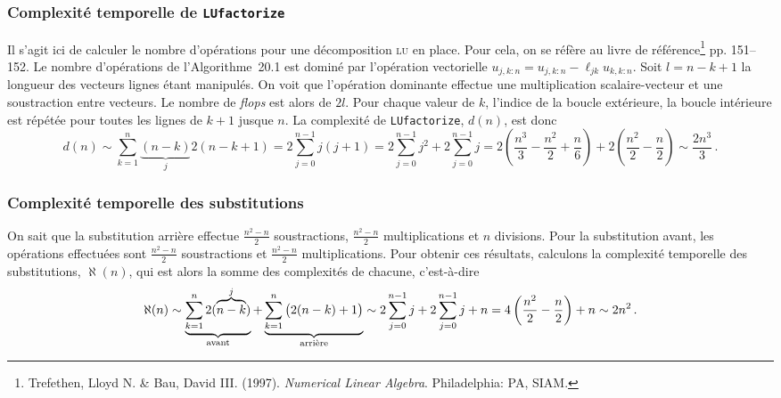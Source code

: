 \documentclass[11pt]{article}
\begin{document}
\subsubsection{Complexité temporelle de \texttt{LUfactorize}}
Il s'agit ici de calculer le nombre d'opérations pour une décomposition \textsc{lu} en place. Pour cela, on se réfère au livre de référence\footnote{Trefethen, Lloyd N. \& Bau, David \textrm{III}. (1997). \textit{Numerical Linear Algebra}. Philadelphia: PA, SIAM.} pp. 151--152.
Le nombre d'opérations de l'Algorithme~20.1 est dominé par l'opération vectorielle $u_{j, k:n} = u_{j, k:n} - \ell_{jk} u_{k, k:n}$.
Soit $l = n - k + 1$ la longueur des vecteurs lignes étant manipulés.
On voit que l'opération dominante effectue une multiplication scalaire-vecteur et une soustraction entre vecteurs. Le nombre de \emph{flops} est alors de $2l$.
Pour chaque valeur de $k$, l'indice de la boucle extérieure, la boucle intérieure est répétée pour toutes les lignes de $k+1$ jusque $n$.
La complexité de \lstinline|LUfactorize|, $d(n)$, est donc
\[
d(n) \sim \sum_{k=1}^{n} \underbrace{(n - k)}_{j} 2(n - k + 1) = 2 \sum_{j=0}^{n-1} j (j+1) = 2 \sum_{j=0}^{n-1} j^2  + 2 \sum_{j=0}^{n-1} j = 2 \left(\frac{n^3}{3} - \frac{n^2}{2} + \frac{n}{6}\right) + 2 \left(\frac{n^2}{2} - \frac{n}{2}\right) \sim \frac{2 n^3}{3}\,. 
\]
\subsubsection{Complexité temporelle des substitutions}
On sait que la substitution arrière effectue $\frac{n^2 - n}{2}$ soustractions, $\frac{n^2 - n}{2}$ multiplications et $n$ divisions.
Pour la substitution avant, les opérations effectuées sont $\frac{n^2 - n}{2}$ soustractions et $\frac{n^2 - n}{2}$ multiplications.
Pour obtenir ces résultats, calculons la complexité temporelle des substitutions, $\aleph(n)$, qui est alors la somme des complexités de chacune, c'est-à-dire
\[
\aleph(n) \sim \underbrace{\sum_{k=1}^{n} 2(\overbrace{n-k}^{j})}_{\textnormal{avant}} + \underbrace{\sum_{k=1}^{n} \big(2(n - k) + 1 \big)}_{\textnormal{arrière}} \sim 2 \sum_{j=0}^{n-1} j + 2 \sum_{j=0}^{n-1} j + n = 4 \left(\frac{n^2}{2} - \frac{n}{2}\right) + n \sim 2 n^2\,.
\]
\end{document}
